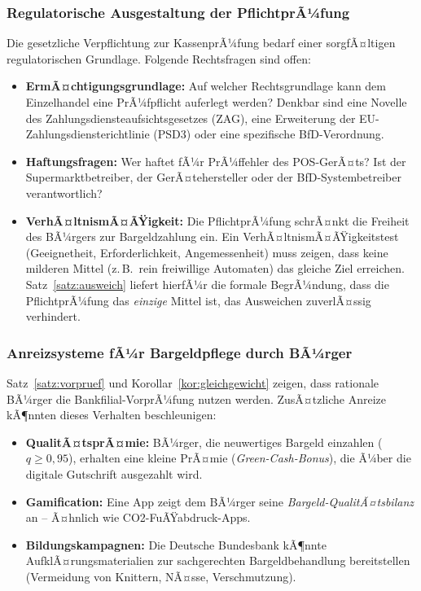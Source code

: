 ﻿\documentclass[a4paper,12pt]{article}
\theoremstyle{definition}
\begin{document}
\subsubsection{Regulatorische Ausgestaltung der PflichtprÃ¼fung}

Die gesetzliche Verpflichtung zur KassenprÃ¼fung bedarf einer sorgfÃ¤ltigen
regulatorischen Grundlage.  Folgende Rechtsfragen sind offen:
\begin{itemize}
  \item \textbf{ErmÃ¤chtigungsgrundlage:}
        Auf welcher Rechtsgrundlage kann dem Einzelhandel eine PrÃ¼fpflicht
        auferlegt werden?  Denkbar sind eine Novelle des Zahlungsdiensteaufsichtsgesetzes
        (ZAG), eine Erweiterung der EU-Zahlungsdiensterichtlinie (PSD3) oder
        eine spezifische BfD-Verordnung.
  \item \textbf{Haftungsfragen:}
        Wer haftet fÃ¼r PrÃ¼ffehler des POS-GerÃ¤ts?  Ist der Supermarktbetreiber,
        der GerÃ¤tehersteller oder der BfD-Systembetreiber verantwortlich?
  \item \textbf{VerhÃ¤ltnismÃ¤ÃŸigkeit:}
        Die PflichtprÃ¼fung schrÃ¤nkt die Freiheit des BÃ¼rgers zur Bargeldzahlung ein.
        Ein VerhÃ¤ltnismÃ¤ÃŸigkeitstest (Geeignetheit, Erforderlichkeit,
        Angemessenheit) muss zeigen, dass keine milderen Mittel
        (z.\,B.\ rein freiwillige Automaten) das gleiche Ziel erreichen.
        Satz~\ref{satz:ausweich} liefert hierfÃ¼r die formale BegrÃ¼ndung,
        dass die PflichtprÃ¼fung das \emph{einzige} Mittel ist, das
        Ausweichen zuverlÃ¤ssig verhindert.
\end{itemize}

\subsubsection{Anreizsysteme fÃ¼r Bargeldpflege durch BÃ¼rger}

Satz~\ref{satz:vorpruef} und Korollar~\ref{kor:gleichgewicht} zeigen,
dass rationale BÃ¼rger die Bankfilial-VorprÃ¼fung nutzen werden.
ZusÃ¤tzliche Anreize kÃ¶nnten dieses Verhalten beschleunigen:
\begin{itemize}
  \item \textbf{QualitÃ¤tsprÃ¤mie:} BÃ¼rger, die neuwertiges Bargeld einzahlen
        ($q \geq 0{,}95$), erhalten eine kleine PrÃ¤mie (\emph{Green-Cash-Bonus}),
        die Ã¼ber die digitale Gutschrift ausgezahlt wird.
  \item \textbf{Gamification:} Eine App zeigt dem BÃ¼rger seine
        \emph{Bargeld-QualitÃ¤tsbilanz} an -- Ã¤hnlich wie CO2-FuÃŸabdruck-Apps.
  \item \textbf{Bildungskampagnen:} Die Deutsche Bundesbank kÃ¶nnte
        AufklÃ¤rungsmaterialien zur sachgerechten Bargeldbehandlung bereitstellen
        (Vermeidung von Knittern, NÃ¤sse, Verschmutzung).
\end{itemize}
\end{document}
